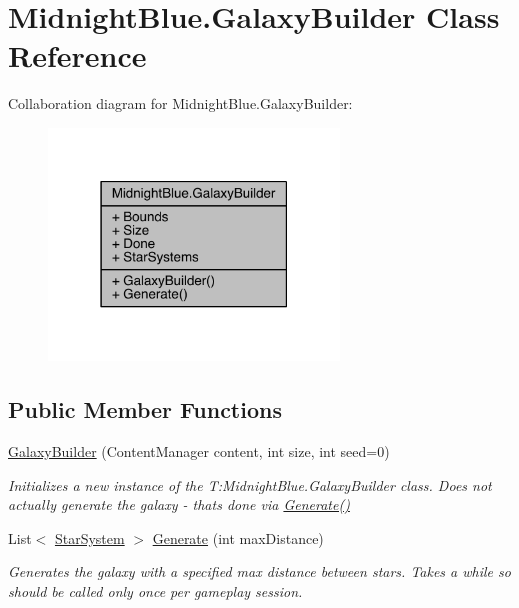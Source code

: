 \hypertarget{class_midnight_blue_1_1_galaxy_builder}{}\section{Midnight\+Blue.\+Galaxy\+Builder Class Reference}
\label{class_midnight_blue_1_1_galaxy_builder}


Collaboration diagram for Midnight\+Blue.\+Galaxy\+Builder\+:\nopagebreak
\begin{figure}[H]
\begin{center}
\leavevmode
\includegraphics[width=219pt]{class_midnight_blue_1_1_galaxy_builder__coll__graph}
\end{center}
\end{figure}
\subsection*{Public Member Functions}
\begin{DoxyCompactItemize}
\item 
\hyperlink{class_midnight_blue_1_1_galaxy_builder_a926e49d9c54675035304d7506c02a0b9}{Galaxy\+Builder} (Content\+Manager content, int size, int seed=0)
\begin{DoxyCompactList}\small\item\em Initializes a new instance of the T\+:\+Midnight\+Blue.\+Galaxy\+Builder class. Does not actually generate the galaxy -\/ that\textquotesingle{}s done via \hyperlink{class_midnight_blue_1_1_galaxy_builder_aaa080e0108cf02709137b7eebb56ad1a}{Generate()} \end{DoxyCompactList}\item 
List$<$ \hyperlink{class_midnight_blue_1_1_star_system}{Star\+System} $>$ \hyperlink{class_midnight_blue_1_1_galaxy_builder_aaa080e0108cf02709137b7eebb56ad1a}{Generate} (int max\+Distance)
\begin{DoxyCompactList}\small\item\em Generates the galaxy with a specified max distance between stars. Takes a while so should be called only once per gameplay session. \end{DoxyCompactList}\end{DoxyCompactItemize}
